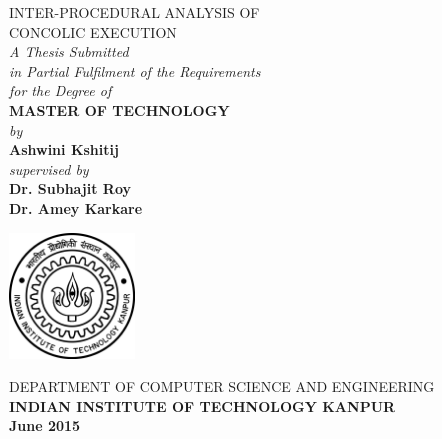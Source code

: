 \documentclass[12pt,oneside]{book}
\date{}
\begin{document}

\begin{titlepage}
    \begin{center}
        \vspace*{1cm}
        
        {\scshape {\huge{I}\Large{NTER-PROCEDURAL} \huge{A}\Large{NALYSIS OF}\\
                   \vspace{0.1cm}
				   \huge{C}\Large{ONCOLIC } \huge{E}\Large{XECUTION}}}\\[1.5cm] %

        
        \textit{A Thesis Submitted\\
        in Partial Fulfilment of the Requirements\\
        for the Degree of\\}
                \vspace{0.8cm}
        \textbf{\large{MASTER OF TECHNOLOGY}}\\[0.5\baselineskip]
        \textit{by}\\[0.5\baselineskip]
        \textbf{\large{Ashwini Kshitij}}\\
                \vspace{0.8cm}
        \textit{supervised by}\\
                \vspace{0.8cm}
        \textbf{\large{Dr. Subhajit Roy}}\\
        \textbf{\large{Dr. Amey Karkare}}
        \vspace{0.8cm}
        
      	\includegraphics[width=0.25\textwidth]{iitklogo.png}
        
        \vspace{1\baselineskip}
        
        \uppercase{Department of Computer Science and Engineering\\
        \textbf{Indian Institute of Technology Kanpur}}\\
        
        \vspace{1\baselineskip}
        \textbf{June 2015}
        
    \end{center}
\end{titlepage}
\end{document}
